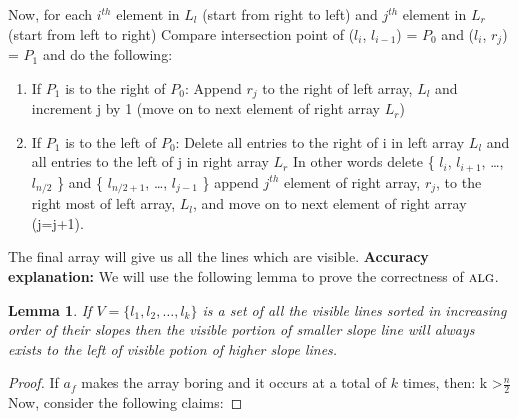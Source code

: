 \documentclass[11pt]{article}
\newcommand{\alg}{\textsc{alg}}
\newtheorem{lemma}[theorem]{Lemma}
\begin{document}
Now, for each $i^{th}$ element in $L_l$ (start from right to left) and $j^{th}$ element in $L_r$ (start from left to right) \newline
Compare intersection point of ($l_i$, $l_{i-1}$) = $P_0$ and  ($l_i$, $r_j$) = $P_1$ and do the following: \newline
\begin{enumerate}
\item If $P_1$ is to the right of $P_0$: \newline
Append $r_j$ to the right of left array, $L_l$ and increment j by 1 (move on to next element of right array $L_r$) \newline
\item If $P_1$ is to the left of $P_0$: \newline
Delete all entries to the right of i in left array $L_l$ and all entries to the left of j in right array $L_r$ \newline
In other words delete \{ $l_i$, $l_{i+1}$, \dots , $l_{n/2}$ \} and \{ $l_{n/2+1}$, \dots, $l_{j-1}$ \} \newline
append $j^{th}$ element of right array, $r_j$, to the right most of left array, $L_l$, and move on to next
element of right array (j=j+1). \newline
\end{enumerate}
The final array will give us all the lines which are visible.   \newline
{\bf Accuracy explanation:}\newline
We will use the following lemma to prove the correctness of $\alg$.

\begin{lemma}\label{visible-lines-lemma}
If $V = \{ l_1, l_2, \dots , l_{k} \}$ is a set of all the visible lines sorted in increasing order of their slopes then
the visible portion of smaller slope line will always exists to the left of visible potion of higher slope lines.
\end{lemma}

\begin{proof}
If $a_f$ makes the array boring and it occurs at a total of $k$ times, then: \newline
k \textgreater $\frac{n}{2}$ \newline
Now, consider the following claims: \newline
\end{proof}
\end{document}
